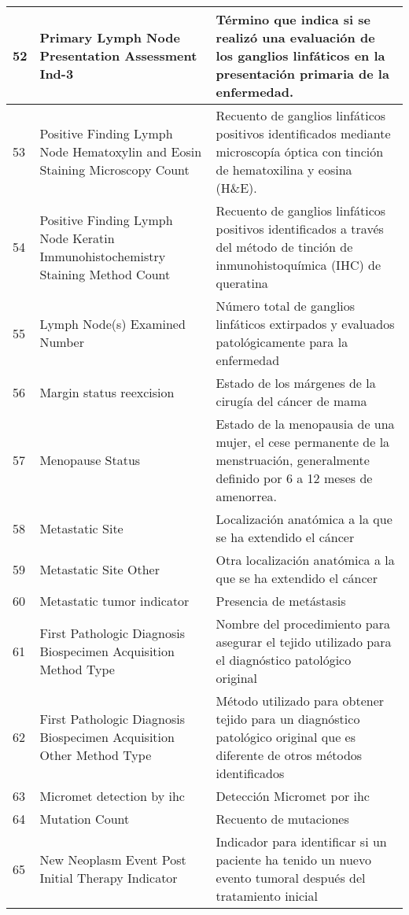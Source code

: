 \begin{table*} [!htb]
	\footnotesize
	\begin{threeparttable}
		\begin{tabular}{p{1cm} p{4cm} p{10cm}}
			\\ \hline	52	&	Primary Lymph Node Presentation Assessment Ind-3	&	Término que indica si se realizó una evaluación de los ganglios linfáticos en la presentación primaria de la enfermedad.
			\\ \hline	53	&	Positive Finding Lymph Node Hematoxylin and Eosin Staining Microscopy Count	&	Recuento de ganglios linfáticos positivos identificados mediante microscopía óptica con tinción de hematoxilina y eosina (H\&E).
			\\ \hline	54	&	Positive Finding Lymph Node Keratin Immunohistochemistry Staining Method Count	&	Recuento de ganglios linfáticos positivos identificados a través del método de tinción de inmunohistoquímica (IHC) de queratina
			\\ \hline	55	&	Lymph Node(s) Examined Number	&	Número total de ganglios linfáticos extirpados y evaluados patológicamente para la enfermedad
			\\ \hline	56	&	Margin status reexcision	&	Estado de los márgenes de la cirugía del cáncer de mama
			\\ \hline	57	&	Menopause Status	&	Estado de la menopausia de una mujer, el cese permanente de la menstruación, generalmente definido por 6 a 12 meses de amenorrea.
			\\ \hline	58	&	Metastatic Site	&	Localización anatómica a la que se ha extendido el cáncer
			\\ \hline	59	&	Metastatic Site Other	&	Otra localización anatómica a la que se ha extendido el cáncer
			\\ \hline	60	&	Metastatic tumor indicator	&	Presencia de metástasis
			\\ \hline	61	&	First Pathologic Diagnosis Biospecimen Acquisition Method Type	&	Nombre del procedimiento para asegurar el tejido utilizado para el diagnóstico patológico original
			\\ \hline	62	&	First Pathologic Diagnosis Biospecimen Acquisition Other Method Type	&	Método utilizado para obtener tejido para un diagnóstico patológico original que es diferente de otros métodos identificados
			\\ \hline	63	&	Micromet detection by ihc	&	Detección Micromet por ihc
			\\ \hline	64	&	Mutation Count	&	Recuento de mutaciones
			\\ \hline	65	&	New Neoplasm Event Post Initial Therapy Indicator	&	Indicador para identificar si un paciente ha tenido un nuevo evento tumoral después del tratamiento inicial

\end{tabular}
\end{threeparttable}
\end{table*}
